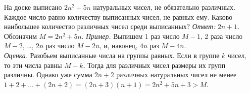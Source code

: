 \problem
На доске выписано $2 n^2 + 5 n$ натуральных чисел, не обязательно различных.
Каждое число равно количеству выписанных чисел, не равных ему.
Каково наибольшее количество различных чисел среди выписанных?
\solution
\emph{Ответ:} $2 n + 1 $.
Обозначим $M = 2 n^2 + 5 n$.
\emph{Пример.}
Выпишем 1 раз число $M - 1$, 2 раза число $M - 2$, \ldots, $2 n$ раз число
$M - 2 n$, и, наконец, $4 n$ раз $M - 4 n$.
\\
\emph{Оценка.}
Разобьем выписанные числа на группы равных.
Если в группе $k$ чисел, то эти числа равны $M - k$.
Тогда для различных чисел размеры их групп различны.
Однако уже сумма $2 n + 2$ различных натуральных чисел не менее
$1 + 2 + \ldots + (2 n + 2) = (2 n + 3) (n + 1) = 2 n^2 + 5 n + 3 > M$. 
\endproblem
